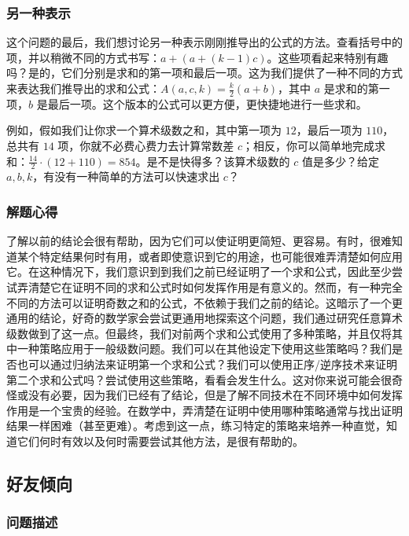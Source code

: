 \subsubsection*{另一种表示}

这个问题的最后，我们想讨论另一种表示刚刚推导出的公式的方法。查看括号中的项，并以稍微不同的方式书写：$a+ (a+ (k-1)c)$。这些项看起来特别有趣吗？是的，它们分别是求和的第一项和最后一项。这为我们提供了一种不同的方式来表达我们推导出的求和公式：$A(a, c, k) = \frac{k}{2}(a + b)$，其中 $a$ 是求和的第一项，$b$ 是最后一项。这个版本的公式可以更方便，更快捷地进行一些求和。

例如，假如我们让你求一个算术级数之和，其中第一项为 $12$，最后一项为 $110$，总共有 $14$ 项，你就不必费心费力去计算常数差 $c$；相反，你可以简单地完成求和：$\frac{14}{2} \cdot (12 + 110) = 854$。是不是快得多？该算术级数的 $c$ 值是多少？给定 $a,b,k$，有没有一种简单的方法可以快速求出 $c$？

\subsubsection*{解题心得}

了解以前的结论会很有帮助，因为它们可以使证明更简短、更容易。有时，很难知道某个特定结果何时有用，或者即使意识到它的用途，也可能很难弄清楚如何应用它。在这种情况下，我们意识到到我们之前已经证明了一个求和公式，因此至少尝试弄清楚它在证明不同的求和公式时如何发挥作用是有意义的。然而，有一种完全不同的方法可以证明奇数之和的公式，不依赖于我们之前的结论。这暗示了一个更通用的结论，好奇的数学家会尝试更通用地探索这个问题，我们通过研究任意算术级数做到了这一点。但最终，我们对前两个求和公式使用了多种策略，并且仅将其中一种策略应用于一般级数问题。我们可以在其他设定下使用这些策略吗？我们是否也可以通过归纳法来证明第一个求和公式？我们可以使用正序/逆序技术来证明第二个求和公式吗？尝试使用这些策略，看看会发生什么。这对你来说可能会很奇怪或没有必要，因为我们已经有了结论，但是了解不同技术在不同环境中如何发挥作用是一个宝贵的经验。在数学中，弄清楚在证明中使用哪种策略通常与找出证明结果一样困难（甚至更难）。考虑到这一点，练习特定的策略来培养一种直觉，知道它们何时有效以及何时需要尝试其他方法，是很有帮助的。

\subsection{好友倾向}\label{sec:section1.4.4}

\subsubsection*{问题描述}

